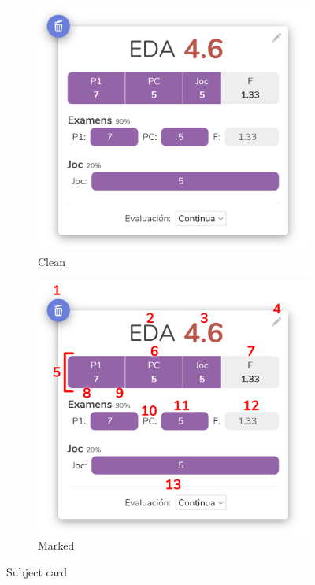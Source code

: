 \begin{figure}[ht!]
    \begin{subfigure}[b]{0.5\textwidth-0.05cm}
        \centering
        \includegraphics[width=\textwidth]{media/screenshots/screenshot-card.png}
        \caption{Clean}
    \end{subfigure}
    \hfill
    \begin{subfigure}[b]{0.5\textwidth-0.05cm}
        \centering
        \includegraphics[width=\textwidth]{media/screenshots/screenshot-card-marked.png}
        \caption{Marked}
    \end{subfigure}
    \caption{Subject card}
    \label{fig:card}
\end{figure}

